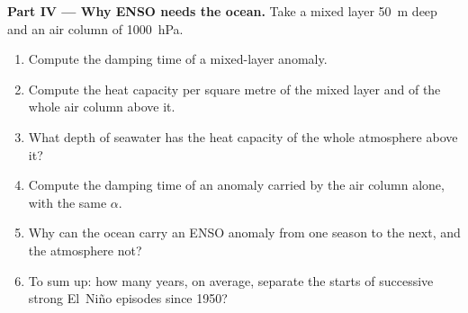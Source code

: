 \begin{problem}
\medskip\noindent\textbf{Part IV --- Why ENSO needs the ocean.}
Take a mixed layer \qty{50}{m} deep and an air column of \qty{1000}{hPa}.
\begin{enumerate}[resume]
  \item Compute the damping time of a mixed-layer anomaly.
  \item Compute the heat capacity per square metre of the mixed layer and of the whole air
        column above it.
  \item What depth of seawater has the heat capacity of the whole atmosphere above it?
  \item Compute the damping time of an anomaly carried by the air column alone, with the same
        $\alpha$.
  \item Why can the ocean carry an ENSO anomaly from one season to the next, and the
        atmosphere not?
  \item To sum up: how many years, on average, separate the starts of successive strong El~Niño
        episodes since 1950?
\end{enumerate}
\end{problem}
